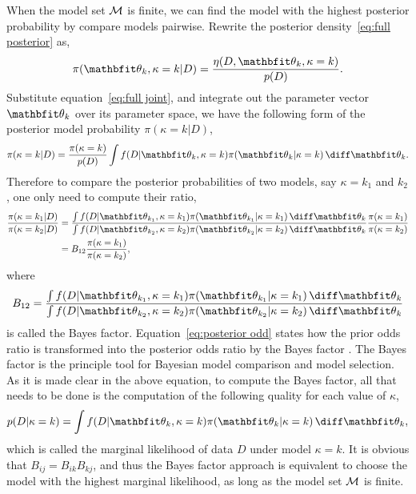 \documentclass[11pt, hyper, bib, fontset=Minion]{marticle}
\begin{document}
When the model set $\mathcal{M}$ is finite, we can find the model with the highest
posterior probability by compare models pairwise. Rewrite the posterior
density~\eqref{eq:full posterior} as,
\begin{equation}
  \pi(\bth_k,\kappa=k|D) = \frac{\eta(D,\bth_k,\kappa=k)}{p(D)}.
\end{equation}
Substitute equation~\eqref{eq:full joint}, and integrate out the parameter
vector $\bth_k$ over its parameter space, we have the following form of the
posterior model probability $\pi(\kappa=k|D)$,
\begin{equation}
  \pi(\kappa=k|D) = \frac{\pi(\kappa = k)}{p(D)}
  \int f(D|\bth_k,\kappa = k)\pi(\bth_k|\kappa = k)\dd\bth_k.
\end{equation}
Therefore to compare the posterior probabilities of two models, say $\kappa =
k_1$ and $k_2$, one only need to compute their ratio,
\begin{align}
  \frac{\pi(\kappa = k_1|D)}{\pi(\kappa = k_2|D)} &= \frac
  {\int f(D|\bth_{k_1},\kappa=k_1)\pi(\bth_{k_1}|\kappa=k_1)\dd\bth_k}
  {\int f(D|\bth_{k_2},\kappa=k_2)\pi(\bth_{k_2}|\kappa=k_2)\dd\bth_k}
  \frac{\pi(\kappa=k_1)}{\pi(\kappa=k_2)} \notag\\
  & = B_{12} \frac{\pi(\kappa=k_1)}{\pi(\kappa=k_2)},
  \label{eq:posterior odd}
\end{align}
where
\begin{equation}
  B_{12} = \frac
  {\int f(D|\bth_{k_1},\kappa=k_1)\pi(\bth_{k_1}|\kappa=k_1)\dd\bth_k}
  {\int f(D|\bth_{k_2},\kappa=k_2)\pi(\bth_{k_2}|\kappa=k_2)\dd\bth_k}
  \label{eq:bayes factor}
\end{equation}
is called the Bayes factor. Equation~\eqref{eq:posterior odd} states how the
prior odds ratio is transformed into the posterior odds ratio by the Bayes
factor \parencite{Kass:1995vb}. The Bayes factor is the principle tool for
Bayesian model comparison and model selection. As it is made clear in the
above equation, to compute the Bayes factor, all that needs to be done is the
computation of the following quality for each value of $\kappa$,
\begin{equation}
  p(D|\kappa = k) = \int f(D|\bth_k,\kappa=k)\pi(\bth_k|\kappa=k)\dd\bth_k,
  \label{eq:marginal likelihood}
\end{equation}
which is called the marginal likelihood of data $D$ under model $\kappa = k$.
It is obvious that $B_{ij} = B_{ik} B_{kj}$, and thus the Bayes factor
approach is equivalent to choose the model with the highest marginal
likelihood, as long as the model set $\mathcal{M}$ is finite.
\end{document}

